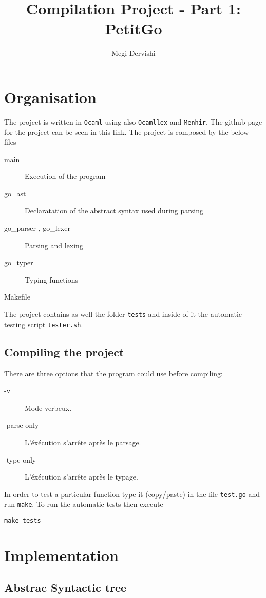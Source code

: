 \documentclass{article}
\title{
  Compilation Project - Part 1: PetitGo}
\author{Megi Dervishi}
\begin{document}
\maketitle

\section{Organisation}
The project is written in \texttt{Ocaml} using also \texttt{Ocamllex} and \texttt{Menhir}. The github page for the project can be seen in this link. The project is composed by the below files

\begin{description}
\item[main] Execution of the program
\item[go\_ast] Declaratation of the abstract syntax used during parsing
\item [go\_parser , go\_lexer] Parsing and lexing
\item [go\_typer] Typing functions
\item [Makefile]
\end{description}
The project contains as well the folder \texttt{tests} and inside of it the automatic testing script \texttt{tester.sh}.

\subsection{Compiling the project}

There are three options that the program could use before compiling:
\begin{description}
\item[-v] Mode verbeux.
\item[-\-parse-only] L'éxécution s'arrête après le parsage.
\item[-\-type-only] L'éxécution s'arrête après le typage.
\end{description}

In order to test a particular function type it (copy/paste) in the file \texttt{test.go} and run \texttt{make}. To run the automatic tests then execute 
\begin{verbatim}
make tests
\end{verbatim}

\section{Implementation}
\subsection{Abstrac Syntactic tree }
\end{document}
